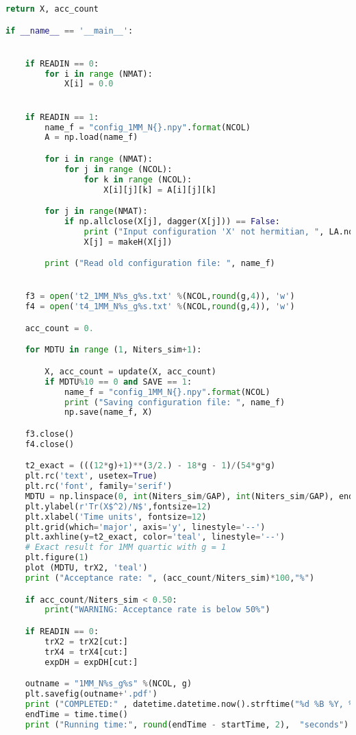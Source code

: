 \begin{lstlisting}[language=Python]
    return X, acc_count

if __name__ == '__main__':


    if READIN == 0:
        for i in range (NMAT): 
            X[i] = 0.0  


    if READIN == 1:
        name_f = "config_1MM_N{}.npy".format(NCOL)
        A = np.load(name_f)

        for i in range (NMAT):
            for j in range (NCOL):
                for k in range (NCOL):
                    X[i][j][k] = A[i][j][k]

        for j in range(NMAT):
            if np.allclose(X[j], dagger(X[j])) == False:
                print ("Input configuration 'X' not hermitian, ", LA.norm(X[j] - dagger(X[j])), "making it so")
                X[j] = makeH(X[j])

        print ("Read old configuration file: ", name_f)


    f3 = open('t2_1MM_N%s_g%s.txt' %(NCOL,round(g,4)), 'w')
    f4 = open('t4_1MM_N%s_g%s.txt' %(NCOL,round(g,4)), 'w')

    acc_count = 0.

    for MDTU in range (1, Niters_sim+1):

        X, acc_count = update(X, acc_count)
        if MDTU%10 == 0 and SAVE == 1:
            name_f = "config_1MM_N{}.npy".format(NCOL)
            print ("Saving configuration file: ", name_f)
            np.save(name_f, X)

    f3.close()
    f4.close()

    t2_exact = (((12*g)+1)**(3/2.) - 18*g - 1)/(54*g*g)
    plt.rc('text', usetex=True)
    plt.rc('font', family='serif')
    MDTU = np.linspace(0, int(Niters_sim/GAP), int(Niters_sim/GAP), endpoint=True)
    plt.ylabel(r'Tr(X$^2)/N$',fontsize=12)
    plt.xlabel('Time units', fontsize=12)
    plt.grid(which='major', axis='y', linestyle='--')
    plt.axhline(y=t2_exact, color='teal', linestyle='--')
    # Exact result for 1MM quartic with g = 1
    plt.figure(1)
    plot (MDTU, trX2, 'teal') 
    print ("Acceptance rate: ", (acc_count/Niters_sim)*100,"%") 

    if acc_count/Niters_sim < 0.50:
        print("WARNING: Acceptance rate is below 50%")

    if READIN == 0:
        trX2 = trX2[cut:]
        trX4 = trX4[cut:]
        expDH = expDH[cut:] 

    outname = "1MM_N%s_g%s" %(NCOL, g)
    plt.savefig(outname+'.pdf')
    print ("COMPLETED:" , datetime.datetime.now().strftime("%d %B %Y, %H:%M:%S"))
    endTime = time.time() 
    print ("Running time:", round(endTime - startTime, 2),  "seconds")
\end{lstlisting}